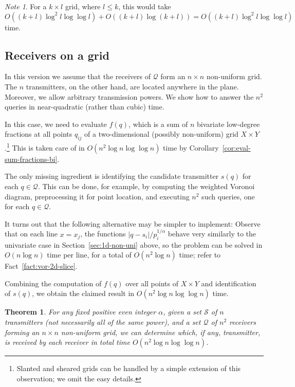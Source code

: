 \documentclass[11pt]{article}
\newtheorem{theorem}{Theorem}[section]
\theoremstyle{remark}
\newtheorem*{note}{Note}
\def\Q{\mathcal{Q}}
\def\S{\mathcal{S}}
\begin{document}
\begin{note}
  For a $k\times l$ grid, where $l \leq k$, this would take $O((k+l) \log^2 l \log \log
  l) + O((k+l)\log (k+l)) = O((k+l) \log^2 l \log \log l)$ time.
\end{note}

\subsection{Receivers on a grid}
\label{sec:rec-grid}
In this version we assume that the receivers of $\Q$ form an $n \times n$ non-uniform grid.
The $n$ transmitters, on the other hand, are located anywhere in the plane. Moreover, we allow arbitrary transmission powers.
We show how to answer the $n^2$ queries in near-quadratic (rather than  cubic) time.

In this case, we need to evaluate $f(q)$, which is a sum of $n$
bivariate low-degree fractions at all points $q_{ij}$ of a
two-dimensional (possibly non-uniform) grid $X \times
Y$.\footnote{Slanted and sheared grids can be handled by a simple
  extension of this observation; we omit the easy details.}
This is taken care of in $O(n^2 \log n \log \log n)$ time by
Corollary~\ref{cor:eval-sum-fractions-bi}.

The only missing ingredient is identifying the candidate transmitter
$s(q)$ for each $q \in \Q$.  This can be done, for example,
by computing the weighted Voronoi diagram, preprocessing it for point
location, and executing $n^2$ such queries, one for each $q \in \Q$.  

It turns out that the following alternative may be 
simpler to implement: Observe that on each line $x=x_j$, the
functions $|q-s_i|/p_i^{1/\alpha}$ behave very similarly to the
univariate case in Section~\ref{sec:1d-non-uni} above, so the problem
can be solved in $O(n \log n)$ time per line, for a total of $O(n^2
\log n)$ time; refer to Fact~\ref{fact:vor-2d-slice}.


Combining the computation of $f(q)$ over all points of $X \times Y$
and identification of $s(q)$, we obtain the claimed result in
$O(n^2 \log n \log \log n)$ time.

\begin{theorem}
  \label{th:2d-receivers-on-grid}
  For any fixed positive even integer $\alpha$, given a set $\S$ of $n$
  transmitters (not necessarily all of the same power), and a set $\Q$ of $n^2$ receivers forming an $n \times n$ non-uniform grid, we can determine
  which, if any, transmitter, is received by each receiver in total time $O(n^2 \log n \log \log n)$.
\end{theorem}
\end{document}
